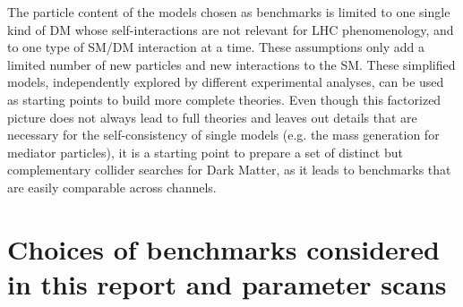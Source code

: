The particle content of the models chosen as benchmarks is limited to
one single kind of DM whose self-interactions are not relevant for LHC
phenomenology, and to one type of SM/DM interaction at a time. These
assumptions only add a limited number of new particles and new interactions to the
SM. These simplified models, independently explored by different
experimental analyses, can be used as starting points to build more
complete theories. Even though this factorized picture does not always
lead to full theories and leaves out details that are necessary for
the self-consistency of single models (e.g. the mass generation for
mediator particles), it is a starting point to prepare a set of
distinct but complementary collider searches for Dark Matter, as
it leads to benchmarks that are easily comparable across channels.

\section{Choices of benchmarks considered in this report and parameter scans}

